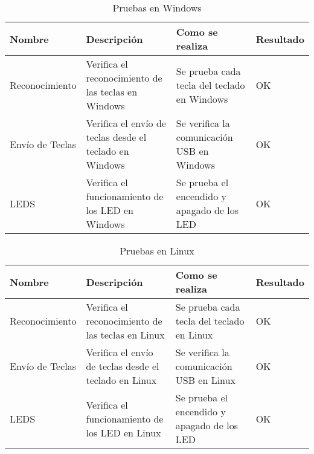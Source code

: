 \begin{table}[!htb]
\small
\begin{tabular}{|l|p{3cm}|p{3.5cm}|l|}
\hline
Nombre           & Descripción                                               & Como se realiza                                    & Resultado \\ \hline
Reconocimiento   & Verifica el reconocimiento de las teclas en \gls{Windows}        & Se prueba cada tecla del teclado en \gls{Windows}        & OK         \\ \hline
Envío de Teclas  & Verifica el envío de teclas desde el teclado en \gls{Windows}    & Se verifica la comunicación USB en \gls{Windows}         & OK         \\ \hline
\gls{LED}S             & Verifica el funcionamiento de los \gls{LED} en \gls{Windows}           & Se prueba el encendido y apagado de los \gls{LED}        & OK         \\ \hline
\end{tabular}
\caption{Pruebas en \gls{Windows}}
\label{Table:PruebaSistemaWindows}
\end{table}

\phantom{Espacio}
\begin{table}[!htb]
\small
\begin{tabular}{|l|p{3cm}|p{3.5cm}|l|}
\hline
Nombre           & Descripción                                               & Como se realiza                                    & Resultado \\ \hline
Reconocimiento   & Verifica el reconocimiento de las teclas en \gls{Linux}        & Se prueba cada tecla del teclado en \gls{Linux}        & OK         \\ \hline
Envío de Teclas  & Verifica el envío de teclas desde el teclado en \gls{Linux}    & Se verifica la comunicación USB en \gls{Linux}         & OK         \\ \hline
\gls{LED}S             & Verifica el funcionamiento de los \gls{LED} en \gls{Linux}           & Se prueba el encendido y apagado de los \gls{LED}        & OK         \\ \hline
\end{tabular}
\caption{Pruebas en \gls{Linux}}
\label{Table:PruebaSistemaLinux}
\end{table}
    